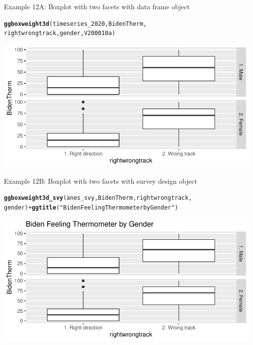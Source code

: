 \documentclass{beamer}\usepackage[]{graphicx}\usepackage[]{color}
\makeatletter
\newcommand{\hlstr}[1]{\textcolor[rgb]{0.192,0.494,0.8}{#1}}%
\newcommand{\hlopt}[1]{\textcolor[rgb]{0,0,0}{#1}}%
\newcommand{\hlstd}[1]{\textcolor[rgb]{0.345,0.345,0.345}{#1}}%
\newcommand{\hlkwd}[1]{\textcolor[rgb]{0.737,0.353,0.396}{\textbf{#1}}}%
\newenvironment{kframe}{%
 \def\at@end@of@kframe{}%
 \ifinner\ifhmode%
  \def\at@end@of@kframe{\end{minipage}}%
  \begin{minipage}{\columnwidth}%
 \fi\fi%
 \def\FrameCommand##1{\hskip\@totalleftmargin \hskip-\fboxsep
 \colorbox{shadecolor}{##1}\hskip-\fboxsep
     \hskip-\linewidth \hskip-\@totalleftmargin \hskip\columnwidth}%
 \MakeFramed {\advance\hsize-\width
   \@totalleftmargin\z@ \linewidth\hsize
   \@setminipage}}%
 {\par\unskip\endMakeFramed%
 \at@end@of@kframe}
\newenvironment{knitrout}{}{} %
\makeatother
\begin{document}
\begin{frame}[fragile]{Example 12A: Boxplot with two facets with data frame object}
\begin{knitrout}
\color{fgcolor}\begin{kframe}
\begin{alltt}
\hlkwd{ggboxweight3d}\hlstd{(timeseries_2020, BidenTherm,}
    \hlstd{rightwrongtrack, gender, V200010a)}
\end{alltt}
\end{kframe}
\includegraphics[width=0.95\linewidth]{figure/unnamed-chunk-49-1} 
\end{knitrout}

\end{frame}

\begin{frame}[fragile]{Example 12B: Boxplot with two facets with survey design object}
\begin{knitrout}
\color{fgcolor}\begin{kframe}
\begin{alltt}
\hlkwd{ggboxweight3d_svy}\hlstd{(anes_svy, BidenTherm, rightwrongtrack,}
    \hlstd{gender)} \hlopt{+} \hlkwd{ggtitle}\hlstd{(}\hlstr{"Biden Feeling Thermometer by Gender"}\hlstd{)}
\end{alltt}
\end{kframe}
\includegraphics[width=0.95\linewidth]{figure/unnamed-chunk-50-1} 
\end{knitrout}

\end{frame}
\end{document}
